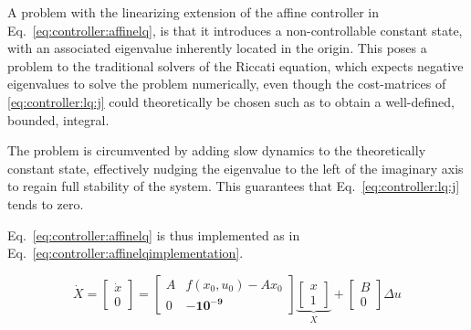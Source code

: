     A problem with the linearizing extension of the affine controller in Eq.~\eqref{eq:controller:affinelq},
    is that it introduces a non-controllable constant state, with
    an associated eigenvalue inherently located in the origin.
    This poses a problem to the traditional solvers of the Riccati equation, which
    expects negative eigenvalues to solve the problem numerically, even though
    the cost-matrices of \eqref{eq:controller:lq:j} could theoretically be chosen such as to
    obtain a well-defined, bounded, integral.

    The problem is circumvented by adding slow dynamics to the theoretically
    constant state, effectively nudging the eigenvalue to the left of the
    imaginary axis to regain full stability of the system.
    This guarantees that Eq.~\eqref{eq:controller:lq:j} tends to zero.

    Eq.~\eqref{eq:controller:affinelq} is thus implemented as in Eq.~\eqref{eq:controller:affinelqimplementation}.

    \begin{equation}
    \label{eq:controller:affinelqimplementation}
        \dot{X} = \left[
        \begin{array}{c}
            \dot{x} \\
            0
        \end{array}\right] =
        \left[
        \begin{array}{cc}
            A & f(x_{0},u_{0})-Ax_{0} \\
            0 & \mathbf{-10^{-9}}
        \end{array}\right]
        \underbrace{\left[
        \begin{array}{c}
            x \\
            1
        \end{array}\right]}_{X}
        +
        \left[
        \begin{array}{c}
            B \\
            0
        \end{array}\right]
        \Delta u
    \end{equation}
